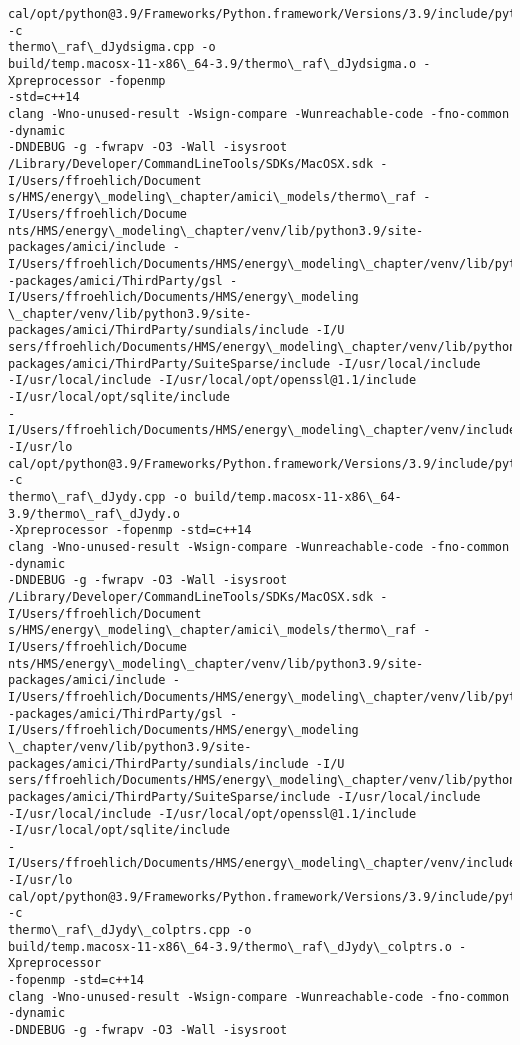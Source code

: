 \documentclass[11pt]{article}
\begin{document}
\begin{Verbatim}[commandchars=\\\{\}]
cal/opt/python@3.9/Frameworks/Python.framework/Versions/3.9/include/python3.9 -c
thermo\_raf\_dJydsigma.cpp -o
build/temp.macosx-11-x86\_64-3.9/thermo\_raf\_dJydsigma.o -Xpreprocessor -fopenmp
-std=c++14
clang -Wno-unused-result -Wsign-compare -Wunreachable-code -fno-common -dynamic
-DNDEBUG -g -fwrapv -O3 -Wall -isysroot
/Library/Developer/CommandLineTools/SDKs/MacOSX.sdk -I/Users/ffroehlich/Document
s/HMS/energy\_modeling\_chapter/amici\_models/thermo\_raf -I/Users/ffroehlich/Docume
nts/HMS/energy\_modeling\_chapter/venv/lib/python3.9/site-packages/amici/include -
I/Users/ffroehlich/Documents/HMS/energy\_modeling\_chapter/venv/lib/python3.9/site
-packages/amici/ThirdParty/gsl -I/Users/ffroehlich/Documents/HMS/energy\_modeling
\_chapter/venv/lib/python3.9/site-packages/amici/ThirdParty/sundials/include -I/U
sers/ffroehlich/Documents/HMS/energy\_modeling\_chapter/venv/lib/python3.9/site-
packages/amici/ThirdParty/SuiteSparse/include -I/usr/local/include
-I/usr/local/include -I/usr/local/opt/openssl@1.1/include
-I/usr/local/opt/sqlite/include
-I/Users/ffroehlich/Documents/HMS/energy\_modeling\_chapter/venv/include -I/usr/lo
cal/opt/python@3.9/Frameworks/Python.framework/Versions/3.9/include/python3.9 -c
thermo\_raf\_dJydy.cpp -o build/temp.macosx-11-x86\_64-3.9/thermo\_raf\_dJydy.o
-Xpreprocessor -fopenmp -std=c++14
clang -Wno-unused-result -Wsign-compare -Wunreachable-code -fno-common -dynamic
-DNDEBUG -g -fwrapv -O3 -Wall -isysroot
/Library/Developer/CommandLineTools/SDKs/MacOSX.sdk -I/Users/ffroehlich/Document
s/HMS/energy\_modeling\_chapter/amici\_models/thermo\_raf -I/Users/ffroehlich/Docume
nts/HMS/energy\_modeling\_chapter/venv/lib/python3.9/site-packages/amici/include -
I/Users/ffroehlich/Documents/HMS/energy\_modeling\_chapter/venv/lib/python3.9/site
-packages/amici/ThirdParty/gsl -I/Users/ffroehlich/Documents/HMS/energy\_modeling
\_chapter/venv/lib/python3.9/site-packages/amici/ThirdParty/sundials/include -I/U
sers/ffroehlich/Documents/HMS/energy\_modeling\_chapter/venv/lib/python3.9/site-
packages/amici/ThirdParty/SuiteSparse/include -I/usr/local/include
-I/usr/local/include -I/usr/local/opt/openssl@1.1/include
-I/usr/local/opt/sqlite/include
-I/Users/ffroehlich/Documents/HMS/energy\_modeling\_chapter/venv/include -I/usr/lo
cal/opt/python@3.9/Frameworks/Python.framework/Versions/3.9/include/python3.9 -c
thermo\_raf\_dJydy\_colptrs.cpp -o
build/temp.macosx-11-x86\_64-3.9/thermo\_raf\_dJydy\_colptrs.o -Xpreprocessor
-fopenmp -std=c++14
clang -Wno-unused-result -Wsign-compare -Wunreachable-code -fno-common -dynamic
-DNDEBUG -g -fwrapv -O3 -Wall -isysroot

\end{Verbatim}
\end{document}
